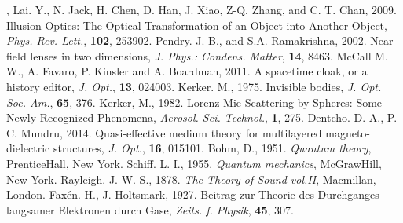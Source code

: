 \begin{thebibliography}{99}
,
Lai. Y., N. Jack, H. Chen, D. Han, J. Xiao, Z-Q. Zhang, and  C. T. Chan, 2009. Illusion Optics: The Optical Transformation of an Object into Another Object,  \textit{Phys. Rev. Lett.}, \textbf{102}, 253902.
Pendry. J. B., and S.A. Ramakrishna, 2002. Near-field lenses in two dimensions, \textit{J. Phys.: Condens. Matter}, \textbf{14}, 8463.
McCall M. W.,  A. Favaro, P. Kinsler and A. Boardman, 2011. 
A spacetime cloak, or a history editor, \textit{J. Opt.}, \textbf{13}, 024003.
Kerker. M., 1975. Invisible bodies, \textit{J. Opt. Soc. Am.}, \textbf{65}, 376.
Kerker, M., 1982. Lorenz-Mie Scattering by Spheres: Some Newly Recognized Phenomena, \textit{Aerosol. Sci. Technol.}, \textbf{1}, 275.
Dentcho. D. A., P. C. Mundru, 2014. Quasi-effective medium theory for multilayered magneto-dielectric structures, \textit{J. Opt.}, \textbf{16}, 015101.
Bohm, D., 1951. \textit{Quantum theory}, Prentice\textendash Hall, New York.
Schiff. L. I., 1955. \textit{Quantum mechanics}, McGraw\textendash Hill, New York.
Rayleigh. J. W. S., 1878. \textit{The Theory of Sound vol.II}, Macmillan, London.
Fax\'{e}n. H., J. Holtsmark, 1927. Beitrag zur Theorie des Durchganges langsamer Elektronen durch Gase, \textit{Zeits. f. Physik}, \textbf{45}, 307.

\end{thebibliography}
